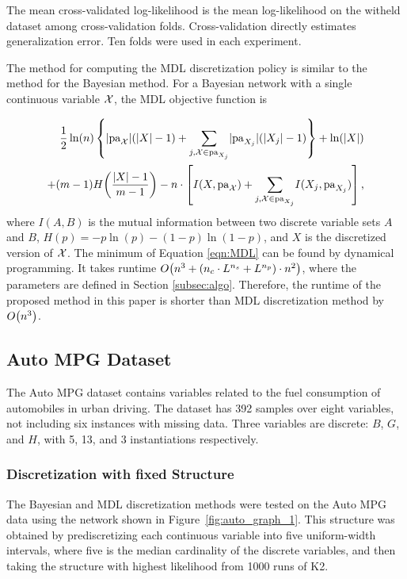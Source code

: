 \noindent
The mean cross-validated log-likelihood is the mean log-likelihood on the witheld dataset among cross-validation folds.
Cross-validation directly estimates generalization error.
Ten folds were used in each experiment.

The method for computing the MDL discretization policy is similar to the method for the Bayesian method.
For a Bayesian network with a single continuous variable $\mathcal{X}$, the MDL objective function is

\begin{equation}
  \label{eqn:MDL}
  \begin{aligned}
  \frac{1}{2} \ln(n) \left\lbrace  \lvert \Pa_{\cX} \rvert (\lvert X \rvert - 1) +
   {\sum_{j,\cX \in \Pa_{X_j}}} \lvert \Pa_{X_j} \rvert (\lvert X_j \rvert - 1) \right\rbrace + \ln(|X|) \\
   + (m-1) H \paren{\frac{|X| - 1}{m -1}} -n \cdot \left[ I(X,\Pa_{\cX}) + {\sum_{j,\cX \in \Pa_{X_j}}} I(X_j, \Pa_{X_j}) \right]\text{,}
  \end{aligned}
\end{equation}
where $I(A,B)$ is the mutual information between two discrete variable sets $A$ and $B$, ${H(p) = -p \ln(p) - (1-p) \ln(1-p)}$, and $X$ is the discretized version of $\mathcal{X}$. The minimum of Equation \ref{eqn:MDL} can be found by dynamical programming. It takes runtime $\bigo \paren{ n^3 + \paren{ n_c \cdot {L}^{n_s}  + {L}^{n_p}} \cdot n^2 }$, where the parameters are defined in Section \ref{subsec:algo}. Therefore, the runtime of the proposed method in this paper is shorter than MDL discretization method by $\bigo \paren{n^3}$.


\subsection{Auto MPG Dataset}
\label{subsec:auto}

The Auto MPG dataset contains variables related to the fuel consumption of automobiles in urban driving.
The dataset has \num{392} samples over eight variables, not including six instances with missing data.
Three variables are discrete: $B$, $G$, and $H$, with \num{5}, \num{13}, and \num{3} instantiations respectively.

\subsubsection{Discretization with fixed Structure}
\label{subsubsec:auto_exp1}

The Bayesian and MDL discretization methods were tested on the Auto MPG data using the network shown in Figure~\ref{fig:auto_graph_1}.
This structure was obtained by prediscretizing each continuous variable into five uniform-width intervals, where five is the median cardinality of the discrete variables, and then taking the structure with highest likelihood from \num{1000} runs of K2.

